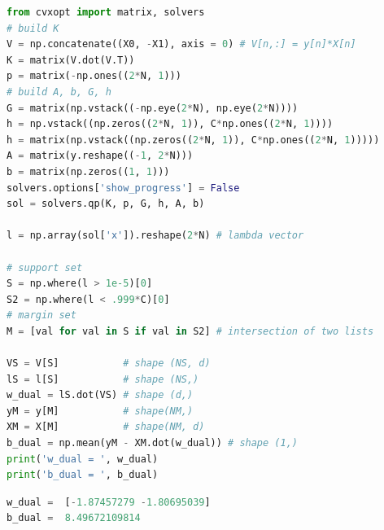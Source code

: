 \begin{lstlisting}[language=Python]
from cvxopt import matrix, solvers
# build K
V = np.concatenate((X0, -X1), axis = 0) # V[n,:] = y[n]*X[n]
K = matrix(V.dot(V.T))
p = matrix(-np.ones((2*N, 1)))
# build A, b, G, h 
G = matrix(np.vstack((-np.eye(2*N), np.eye(2*N))))
h = np.vstack((np.zeros((2*N, 1)), C*np.ones((2*N, 1))))
h = matrix(np.vstack((np.zeros((2*N, 1)), C*np.ones((2*N, 1)))))
A = matrix(y.reshape((-1, 2*N))) 
b = matrix(np.zeros((1, 1))) 
solvers.options['show_progress'] = False
sol = solvers.qp(K, p, G, h, A, b)

l = np.array(sol['x']).reshape(2*N) # lambda vector 

# support set 
S = np.where(l > 1e-5)[0] 
S2 = np.where(l < .999*C)[0]
# margin set 
M = [val for val in S if val in S2] # intersection of two lists

VS = V[S]           # shape (NS, d)
lS = l[S]           # shape (NS,)
w_dual = lS.dot(VS) # shape (d,)
yM = y[M]           # shape(NM,)
XM = X[M]           # shape(NM, d)
b_dual = np.mean(yM - XM.dot(w_dual)) # shape (1,)
print('w_dual = ', w_dual)
print('b_dual = ', b_dual)
\end{lstlisting}
\kq 
\begin{lstlisting}[language=Python]
w_dual =  [-1.87457279 -1.80695039]
b_dual =  8.49672109814
\end{lstlisting}


 
 
